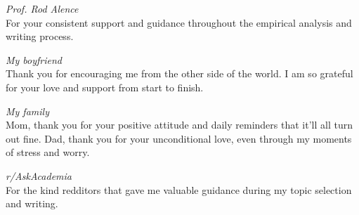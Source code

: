 \documentclass[
12pt, %
oneside, %
english, %
onehalfspacing, %
liststotoc, %
headsepline, %
chapterinoneline, %
svgnames %
]{MastersDoctoralThesis} %
\begin{document}
\begin{acknowledgements}
\emph{Prof. Rod Alence}\\
For your consistent support and guidance throughout the empirical analysis and writing process. \\
\vspace{0.4cm}

\emph{My boyfriend}\\
Thank you for encouraging me from the other side of the world. I am so grateful for your love and support from start to finish.\\
\vspace{0.4cm}

\emph{My family}\\
Mom, thank you for your positive attitude and daily reminders that it'll all turn out fine. Dad, thank you for your unconditional love, even through my moments of stress and worry. \\
\vspace{0.4cm}

\emph{r/AskAcademia}\\
For the kind redditors that gave me valuable guidance during my topic selection and writing. \\
\vspace{0.4cm}

\end{acknowledgements}


\tableofcontents %



\mainmatter %

\pagestyle{thesis} %



 

 

\end{document}
